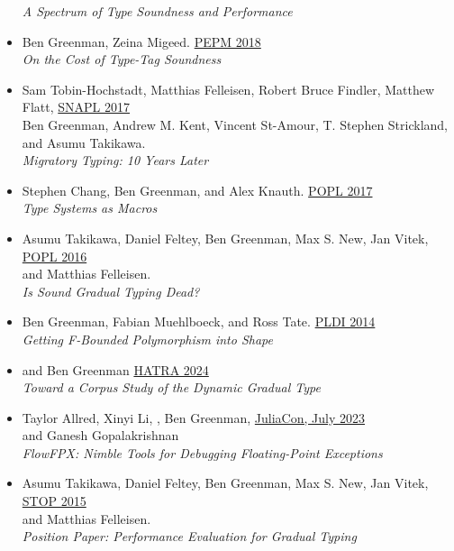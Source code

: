 \documentclass[11pt]{article}
\begin{document}
\begin{itemize}
  \emph{A Spectrum of Type Soundness and Performance} \hfill {}
\item
  Ben Greenman, Zeina Migeed. \hfill \href{https://popl18.sigplan.org/track/PEPM-2018}{PEPM 2018} \\
  \emph{On the Cost of Type-Tag Soundness} \hfill {} %
\item
  Sam Tobin-Hochstadt, Matthias Felleisen, Robert Bruce Findler, Matthew Flatt, \hfill \href{https://snapl.org/2017/}{SNAPL 2017} \\
  Ben Greenman, Andrew M. Kent, Vincent St-Amour, T. Stephen Strickland, \\
  and Asumu Takikawa. \\
  \emph{Migratory Typing: 10 Years Later} \hfill {}
\item
  Stephen Chang, Ben Greenman, and Alex Knauth. \hfill \href{https://popl17.sigplan.org/}{POPL 2017} \\
   \emph{Type Systems as Macros} \hfill {}
\item
  Asumu Takikawa, Daniel Feltey, Ben Greenman, Max S. New, Jan Vitek, \hfill \href{https://popl16.sigplan.org/}{POPL 2016} \\
   and Matthias Felleisen. \\
   \emph{Is Sound Gradual Typing Dead?} \hfill {} %
\item
  Ben Greenman, Fabian Muehlboeck, and Ross Tate. \hfill \href{https://conferences.inf.ed.ac.uk/pldi2014/}{PLDI 2014} \\
  \emph{Getting F-Bounded Polymorphism into Shape} \hfill {}
\end{itemize}

\begin{itemize}
  \item
     and Ben Greenman \hfill \href{https://2024.splashcon.org/home/hatra-2024}{HATRA 2024} \\
      \emph{Toward a Corpus Study of the Dynamic Gradual Type}
  \item
    Taylor Allred, Xinyi Li, , Ben Greenman, \hfill \href{https://juliacon.org/2023/}{JuliaCon, July 2023} \\
     and Ganesh Gopalakrishnan  \\
     \emph{FlowFPX: Nimble Tools for Debugging Floating-Point Exceptions}
  \item
    Asumu Takikawa, Daniel Feltey, Ben Greenman, Max S. New, Jan Vitek, \hfill \href{https://2015.ecoop.org/track/STOP2015}{STOP 2015} \\
     and Matthias Felleisen. \\
     \emph{Position Paper: Performance Evaluation for Gradual Typing}
\end{itemize}
\end{document}

